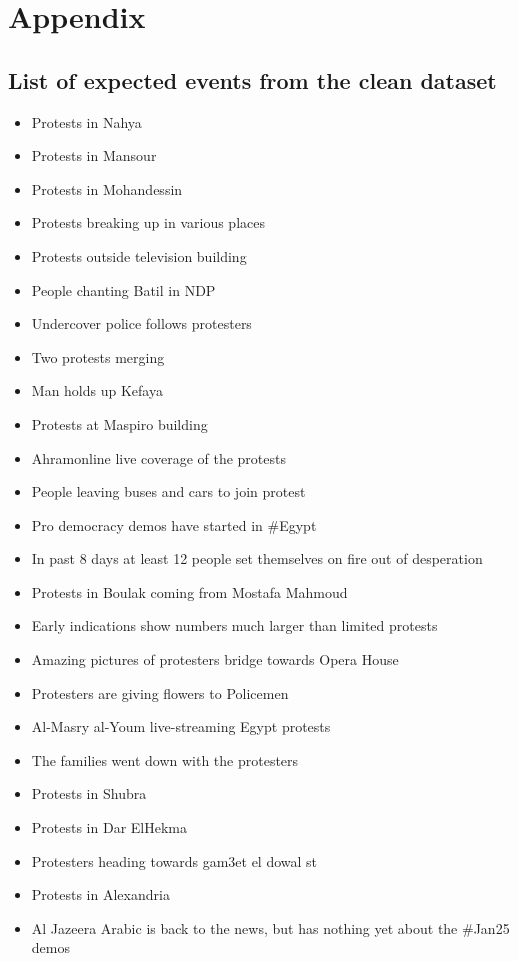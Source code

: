 \chapter{Appendix}\label{Appendix}

\section{List of expected events from the clean dataset}\label{EventList}

\begin{itemize}
 \item Protests in Nahya
 \item Protests in Mansour
 \item Protests in Mohandessin 
 \item Protests breaking up in various places
 \item Protests outside television building
 \item People chanting Batil in NDP
 \item Undercover police follows protesters
 \item Two protests merging
 \item Man holds up Kefaya 
 \item Protests at Maspiro building
 \item Ahramonline live coverage of the protests
 \item People leaving buses and cars to join protest
 \item Pro democracy demos have started in \#Egypt
 \item In past 8 days at least 12 people set themselves on fire out of desperation
 \item Protests in Boulak coming from Mostafa Mahmoud
 \item Early indications show numbers much larger than limited protests
 \item Amazing pictures of protesters bridge towards Opera House 
 \item Protesters are giving flowers to Policemen
 \item Al-Masry al-Youm live-streaming Egypt protests
 \item The families went down with the protesters
 \item Protests in Shubra
 \item Protests in Dar ElHekma
 \item Protesters heading towards gam3et el dowal st
 \item Protests in Alexandria 
 \item Al Jazeera Arabic is back to the news, but has nothing yet about the \#Jan25 demos

\end{itemize}
